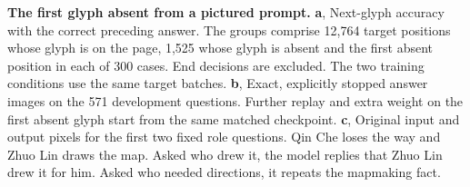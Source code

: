 \textbf{The first glyph absent from a pictured prompt.}
\textbf{a}, Next-glyph accuracy with the correct preceding answer. The groups comprise 12,764 target positions whose glyph is on the page, 1,525 whose glyph is absent and the first absent position in each of 300 cases. End decisions are excluded. The two training conditions use the same target batches.
\textbf{b}, Exact, explicitly stopped answer images on the 571 development questions. Further replay and extra weight on the first absent glyph start from the same matched checkpoint.
\textbf{c}, Original input and output pixels for the first two fixed role questions. Qin Che loses the way and Zhuo Lin draws the map. Asked who drew it, the model replies that Zhuo Lin drew it for him. Asked who needed directions, it repeats the mapmaking fact.
